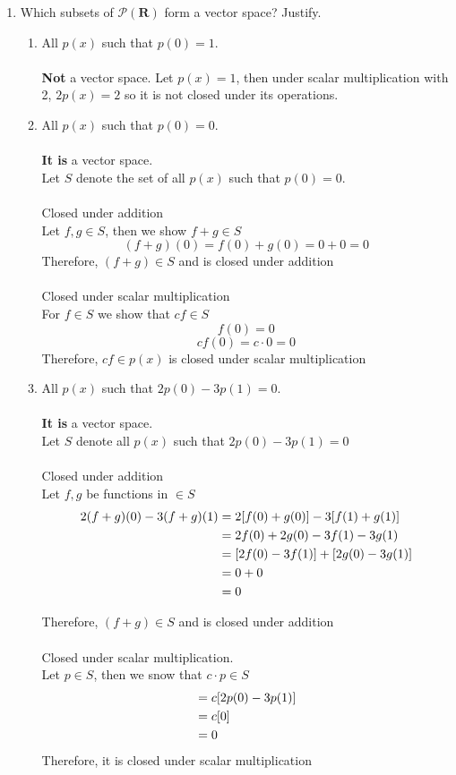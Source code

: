 \documentclass[12pt]{article}
\begin{document}
\begin{enumerate}
\item Which subsets of $\mathcal{P}(\mathbf{R})$ form a vector space?  Justify.
    \begin{enumerate}
    \item All $p(x)$ such that $p(0)=1$.\\
    \\\textbf{Not} a vector space. Let $p(x) = 1$, then under scalar multiplication with 2, $2p(x) = 2$ so it is not closed under its operations.
    \vspace{0.4in}
    \item All $p(x)$ such that $p(0)=0$.\\
    \\\textbf{It is} a vector space.
    \\Let $S$ denote the set of all $p(x)$ such that $p(0)=0$.
    \\\\Closed under addition\\Let $f, g \in S$, then we show $f+g \in S$
    $$(f+g)(0) = f(0) + g(0) = 0 + 0 = 0$$
    Therefore, $(f+g) \in S$ and is closed under addition\\
    \\Closed under scalar multiplication
    \\For $f \in S$ we show that $cf \in S$
    $$f(0) = 0$$
    $$cf(0) = c\cdot 0 = 0$$
    Therefore, $cf\in p(x)$ is closed under scalar multiplication
    \vspace{0.4in}
    \item All $p(x)$ such that $2p(0)-3p(1)=0$.
    \\\\\textbf{It is} a vector space.
    \\Let $S$ denote all $p(x)$ such that $2p(0)-3p(1)=0$
    \\\\Closed under addition\\Let $f, g$ be functions in $\in S$
    \begin{align}
        2(f+g)(0) -  3(f+g)(1) & = 
    2[f(0) + g(0)] - 3[f(1)+g(1)] \notag\\
    &= 2f(0) + 2g(0) - 3f(1) - 3g(1) \notag\\
    &= [2f(0) - 3f(1)] + [2g(0) - 3g(1)] \notag\\
    &= 0 + 0 \notag\\ 
    &= 0 \notag
    \end{align}
    
    Therefore, $(f+g) \in S$ and is closed under addition\\
    \\Closed under scalar multiplication.\\Let $p \in S$, then we snow that $c\cdot p \in S$
    \begin{align}
        [2cp(0) - 3cp(1)] &= c[2p(0) - 3p(1)] \notag\\ &= c[0] \notag\\ &= 0 \notag
    \end{align}    Therefore, it is closed under scalar multiplication
    \vspace{0.4in}
    \end{enumerate}


\end{enumerate}
\end{document}
